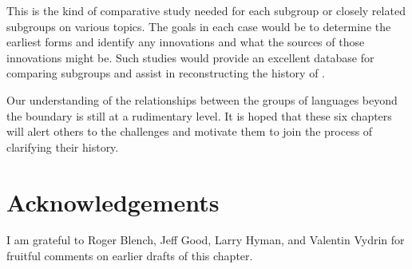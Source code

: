 \documentclass[output=paper]{langsci/langscibook}
\begin{document}
This is the kind of comparative study needed for each subgroup or closely related subgroups on various topics. The goals in each case would be to determine the earliest forms and identify any innovations and what the sources of those innovations might be.  Such studies would provide an excellent database for comparing  subgroups and assist in reconstructing the history of .

Our understanding of the relationships between the groups of languages beyond the  boundary is still at a rudimentary level. It is hoped that these six chapters will alert others to the challenges and motivate them to join the process of clarifying their history. 

\section*{Acknowledgements}

I am grateful to Roger Blench, Jeff Good, Larry Hyman, and Valentin Vydrin for fruitful comments on earlier drafts of this chapter. 
 
{\sloppy
\printbibliography[heading=subbibliography,notkeyword=this]
}
\end{document}
